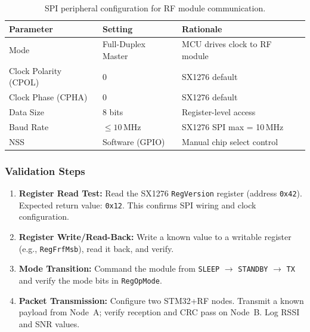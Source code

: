 \documentclass[11pt,letterpaper]{article}
\begin{document}
	\begin{table}[ht!]
		\centering
		\caption{SPI peripheral configuration for RF module communication.}
		\label{tab:spi}
		\renewcommand{\arraystretch}{1.3}
		\begin{tabular}{l l l}
			\toprule
			\textbf{Parameter} & \textbf{Setting} & \textbf{Rationale} \\
			\midrule
			Mode & Full-Duplex Master & MCU drives clock to RF module \\
			Clock Polarity (CPOL) & 0 & SX1276 default \\
			Clock Phase (CPHA) & 0 & SX1276 default \\
			Data Size & 8 bits & Register-level access \\
			Baud Rate & $\leq 10$\,MHz & SX1276 SPI max = 10\,MHz \\
			NSS & Software (GPIO) & Manual chip select control \\
			\bottomrule
		\end{tabular}
	\end{table}
	
	\subsubsection{Validation Steps}
	
	\begin{enumerate}[leftmargin=2em]
		\item \textbf{Register Read Test:} Read the SX1276 \texttt{RegVersion} register (address \texttt{0x42}). Expected return value: \texttt{0x12}. This confirms SPI wiring and clock configuration.
		\item \textbf{Register Write/Read-Back:} Write a known value to a writable register (e.g., \texttt{RegFrfMsb}), read it back, and verify.
		\item \textbf{Mode Transition:} Command the module from \texttt{SLEEP} $\rightarrow$ \texttt{STANDBY} $\rightarrow$ \texttt{TX} and verify the mode bits in \texttt{RegOpMode}.
		\item \textbf{Packet Transmission:} Configure two STM32+RF nodes. Transmit a known payload from Node~A; verify reception and CRC pass on Node~B. Log RSSI and SNR values.
	\end{enumerate}
	
\end{document}
